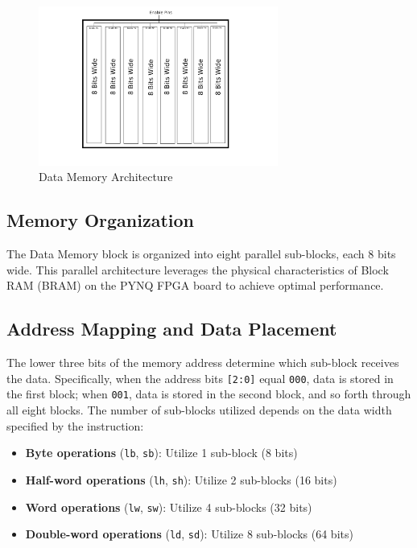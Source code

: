 \documentclass{article}
\begin{document}
\begin{figure}[H]
    \centering
    \includegraphics[width=0.7\textwidth]{data_memory.png}
    \caption{Data Memory Architecture}
    \label{fig:data_memory}
\end{figure}

\subsection*{Memory Organization}

The Data Memory block is organized into eight parallel sub-blocks, each 8 bits wide. This parallel architecture leverages the physical characteristics of Block RAM (BRAM) on the PYNQ FPGA board to achieve optimal performance.

\subsection*{Address Mapping and Data Placement}

The lower three bits of the memory address determine which sub-block receives the data. Specifically, when the address bits \texttt{[2:0]} equal \texttt{000}, data is stored in the first block; when \texttt{001}, data is stored in the second block, and so forth through all eight blocks. The number of sub-blocks utilized depends on the data width specified by the instruction:

\begin{itemize}
    \item \textbf{Byte operations} (\texttt{lb}, \texttt{sb}): Utilize 1 sub-block (8 bits)
    \item \textbf{Half-word operations} (\texttt{lh}, \texttt{sh}): Utilize 2 sub-blocks (16 bits)
    \item \textbf{Word operations} (\texttt{lw}, \texttt{sw}): Utilize 4 sub-blocks (32 bits)
    \item \textbf{Double-word operations} (\texttt{ld}, \texttt{sd}): Utilize 8 sub-blocks (64 bits)
\end{itemize}
\end{document}
